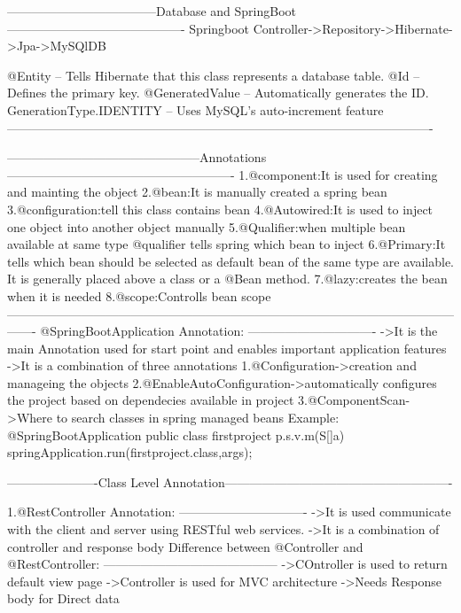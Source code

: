 ------------------------------------Database and SpringBoot -------------------------------------------
Springboot Controller->Repository->Hibernate->Jpa->MySQlDB

@Entity – Tells Hibernate that this class represents a database table.
@Id – Defines the primary key.
@GeneratedValue – Automatically generates the ID.
GenerationType.IDENTITY – Uses MySQL's auto-increment feature
-------------------------------------------------------------------------------------------------------

  -----------------------------------------------Annotations-------------------------------------------------------
			1.@component:It is used for creating and mainting the object
			2.@bean:It is manually created a spring bean
			3.@configuration:tell this class contains bean
			4.@Autowired:It is used to inject one object into another object manually
			5.@Qualifier:when multiple bean available at same type @qualifier tells spring which bean to inject
			6.@Primary:It tells which bean should be selected as default bean of the same type are available. It is generally placed above a class or a @Bean method.
			7.@lazy:creates the bean when it is needed
			8.@scope:Controlls bean scope
			-------------------------------------------------------------------------------------------------------------------
				@SpringBootApplication Annotation:
				-------------------------------
						->It is the main Annotation used for start point and enables important application features
						->It is a combination of three annotations
							1.@Configuration->creation and manageing the objects
							2.@EnableAutoConfiguration->automatically configures the project based on dependecies available in project
							3.@ComponentScan->Where to search classes in spring managed beans
					Example:
							@SpringBootApplication
							public class firstproject{
								p.s.v.m(S[]a){
								springApplication.run(firstproject.class,args);
								}
							}
							
							
				----------------------Class Level Annotation-------------------------------------------------------
	


				1.@RestController Annotation:
				------------------------------- 
							->It is used communicate with the client and server using RESTful web services.
							->It is a combination of controller and response body
						Difference between @Controller and @RestController:
						------------------------------------------
							->COntroller is used to return default view page
							->Controller is used for MVC architecture
							->Needs Response body for Direct data




